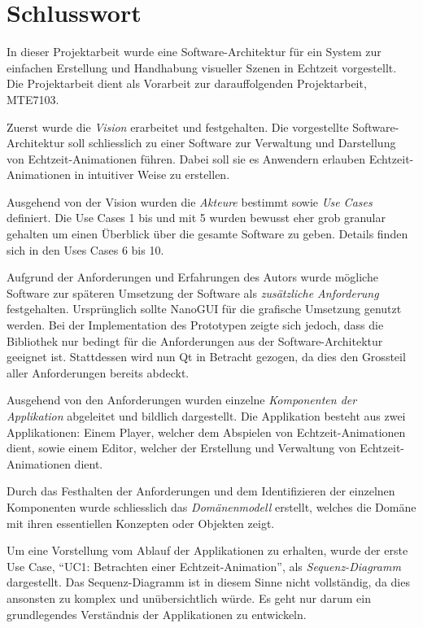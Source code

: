 
\chapter{Schlusswort}
\label{chap:discussion_and_conclusion}

In dieser Projektarbeit wurde eine Software-Architektur für ein System zur
einfachen Erstellung und Handhabung visueller Szenen in Echtzeit vorgestellt.
Die Projektarbeit dient als Vorarbeit zur darauffolgenden Projektarbeit,
MTE7103.

Zuerst wurde die \textit{Vision} erarbeitet und festgehalten. Die vorgestellte
Software-Architektur soll schliesslich zu einer Software zur Verwaltung und
Darstellung von Echtzeit-Animationen führen. Dabei soll sie es Anwendern
erlauben Echtzeit-Animationen in intuitiver Weise zu erstellen.

Ausgehend von der Vision wurden die \textit{Akteure} bestimmt sowie \textit{Use
    Cases} definiert.  Die Use Cases 1 bis und mit 5 wurden bewusst eher grob
granular gehalten um einen Überblick über die gesamte Software zu geben.
Details finden sich in den Uses Cases 6 bis 10.

Aufgrund der Anforderungen und Erfahrungen des Autors wurde mögliche Software
zur späteren Umsetzung der Software als \textit{zusätzliche Anforderung}
festgehalten.  Ursprünglich sollte NanoGUI für die grafische Umsetzung genutzt
werden. Bei der Implementation des Prototypen zeigte sich jedoch, dass die
Bibliothek nur bedingt für die Anforderungen aus der Software-Architektur
geeignet ist.  Stattdessen wird nun Qt in Betracht gezogen, da dies den
Grossteil aller Anforderungen bereits abdeckt.

Ausgehend von den Anforderungen wurden einzelne \textit{Komponenten der
    Applikation} abgeleitet und bildlich dargestellt. Die Applikation besteht
aus zwei Applikationen: Einem Player, welcher dem Abspielen von
Echtzeit-Animationen dient, sowie einem Editor, welcher der Erstellung und
Verwaltung von Echtzeit-Animationen dient.

Durch das Festhalten der Anforderungen und dem Identifizieren der einzelnen
Komponenten wurde schliesslich das \textit{Domänenmodell} erstellt, welches die Domäne
mit ihren essentiellen Konzepten oder Objekten zeigt.

Um eine Vorstellung vom Ablauf der Applikationen zu erhalten, wurde der erste
Use Case, ``UC1: Betrachten einer Echtzeit-Animation'', als
\textit{Sequenz-Diagramm} dargestellt. Das Sequenz-Diagramm ist in diesem Sinne
nicht vollständig, da dies ansonsten zu komplex und unübersichtlich würde. Es
geht nur darum ein grundlegendes Verständnis der Applikationen zu entwickeln.

